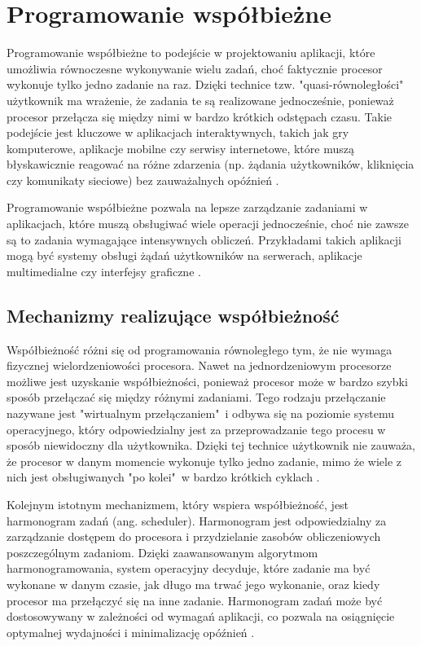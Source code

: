 \section{Programowanie współbieżne}

Programowanie współbieżne to podejście w projektowaniu aplikacji, które umożliwia równoczesne wykonywanie wielu zadań, choć faktycznie procesor wykonuje tylko jedno zadanie na raz. Dzięki technice tzw. "quasi-równoległości"\ \cite{Paluch} użytkownik ma wrażenie, że zadania te są realizowane jednocześnie, ponieważ procesor przełącza się między nimi w bardzo krótkich odstępach czasu. Takie podejście jest kluczowe w aplikacjach interaktywnych, takich jak gry komputerowe, aplikacje mobilne czy serwisy internetowe, które muszą błyskawicznie reagować na różne zdarzenia (np. żądania użytkowników, kliknięcia czy komunikaty sieciowe) bez zauważalnych opóźnień \cite{MasteringConcurrencyAndParallelProgramming}.

Programowanie współbieżne pozwala na lepsze zarządzanie zadaniami w aplikacjach, które muszą obsługiwać wiele operacji jednocześnie, choć nie zawsze są to zadania wymagające intensywnych obliczeń. Przykładami takich aplikacji mogą być systemy obsługi żądań użytkowników na serwerach, aplikacje multimedialne czy interfejsy graficzne \cite{IntroductionToConcurrencyAndParallelism}.

\subsection{Mechanizmy realizujące współbieżność}
Współbieżność różni się od programowania równoległego tym, że nie wymaga fizycznej wielordzeniowości procesora. Nawet na jednordzeniowym procesorze możliwe jest uzyskanie współbieżności, ponieważ procesor może w bardzo szybki sposób przełączać się między różnymi zadaniami. Tego rodzaju przełączanie nazywane jest "wirtualnym przełączaniem"\ i odbywa się na poziomie systemu operacyjnego, który odpowiedzialny jest za przeprowadzanie tego procesu w sposób niewidoczny dla użytkownika. Dzięki tej technice użytkownik nie zauważa, że procesor w danym momencie wykonuje tylko jedno zadanie, mimo że wiele z nich jest obsługiwanych "po kolei"\ w bardzo krótkich cyklach \cite{ConcurrencyInAction, RustAtomicsAndLocks}.

Kolejnym istotnym mechanizmem, który wspiera współbieżność, jest harmonogram zadań (ang. scheduler). Harmonogram jest odpowiedzialny za zarządzanie dostępem do procesora i przydzielanie zasobów obliczeniowych poszczególnym zadaniom. Dzięki zaawansowanym algorytmom harmonogramowania, system operacyjny decyduje, które zadanie ma być wykonane w danym czasie, jak długo ma trwać jego wykonanie, oraz kiedy procesor ma przełączyć się na inne zadanie. Harmonogram zadań może być dostosowywany w zależności od wymagań aplikacji, co pozwala na osiągnięcie optymalnej wydajności i minimalizację opóźnień \cite{ConcurrencyInAction}.

